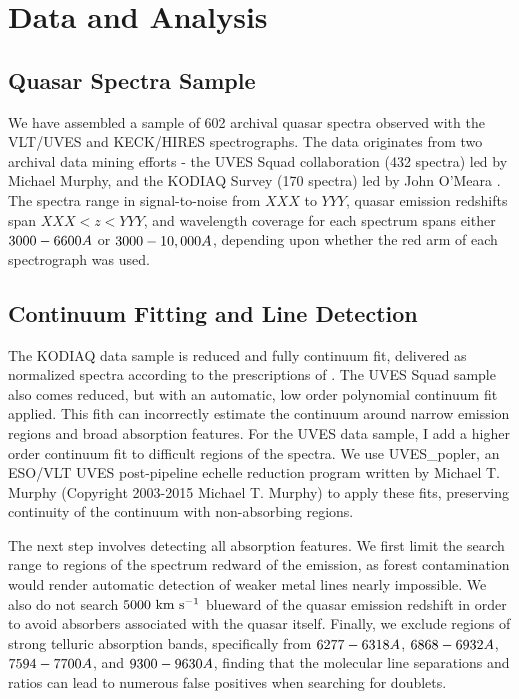 \documentclass[iop,apj,numberedappendix,appendixfloats,twocolappendix]{emulateapj}
\begin{document}

\section{Data and Analysis}
\label{sec:data}

\subsection{Quasar Spectra Sample}

We have assembled a sample of 602 archival quasar spectra observed with the VLT/UVES and KECK/HIRES spectrographs. The data originates from two archival data mining efforts - the UVES Squad collaboration (432 spectra) led by Michael Murphy, and the KODIAQ Survey (170 spectra) led by John O'Meara \citep{OMeara2015}. The spectra range in signal-to-noise from $XXX$ to $YYY$, quasar emission redshifts span $XXX < z < YYY$, and wavelength coverage for each spectrum spans either $3000 - 6600\AA$ or $3000 - 10,000\AA$, depending upon whether the red arm of each spectrograph was used.


\subsection{Continuum Fitting and Line Detection}
\label{sec:detection}

The KODIAQ data sample is reduced and fully continuum fit, delivered as normalized spectra according to the prescriptions of \cite{OMeara2015}. The UVES Squad sample also comes reduced, but with an automatic, low order polynomial continuum fit applied. This fith can incorrectly estimate the continuum around narrow emission regions and broad absorption features. For the UVES data sample, I add a higher order continuum fit to difficult regions of the spectra. We use UVES\_popler, an ESO/VLT UVES post-pipeline echelle reduction program written by Michael T. Murphy (Copyright 2003-2015 Michael T. Murphy) to apply these fits, preserving continuity of the continuum with non-absorbing regions. 

The next step involves detecting all {\MgII} absorption features. We first limit the search range to regions of the spectrum redward of the {\Lya} emission, as {\Lya} forest contamination would render automatic detection of weaker metal lines nearly impossible. We also do not search $5000~\hbox{km~s$^{-1}$}$ blueward of the quasar emission redshift in order to avoid absorbers associated with the quasar itself. Finally, we exclude regions of strong telluric absorption bands, specifically from $6277 - 6318 \AA$, $6868 - 6932 \AA$, $7594 - 7700 \AA$, and $9300 - 9630 \AA$, finding that the molecular line separations and ratios can lead to numerous false positives when searching for {\MgII} doublets. 
\end{document}
